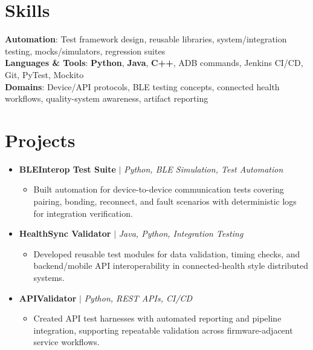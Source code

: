 \documentclass[letterpaper,10pt]{article}
\newcommand{\resumeItem}[1]{\item\small{{#1 \vspace{-2pt}}}}
\newcommand{\resumeProjectHeading}[1]{\item \small #1 \vspace{-2pt}}
\newcommand{\resumeSubHeadingListStart}{\begin{itemize}[leftmargin=0.0in, label={}]}
\newcommand{\resumeSubHeadingListEnd}{\end{itemize}}
\newcommand{\resumeProjItemListStart}{\begin{itemize}[leftmargin=0.15in,label=\textbullet,itemsep=0pt,topsep=0pt,parsep=0pt,partopsep=0pt]}
\newcommand{\resumeProjItemListEnd}{\end{itemize}\vspace{-4pt}}
\begin{document}
\section{Skills}
\begin{itemize}[leftmargin=0.15in, label={}]
\small{\item{
\textbf{Automation}: Test framework design, reusable libraries, system/integration testing, mocks/simulators, regression suites \\
\textbf{Languages \& Tools}: \textbf{Python}, \textbf{Java}, \textbf{C++}, ADB commands, Jenkins CI/CD, Git, PyTest, Mockito \\
\textbf{Domains}: Device/API protocols, BLE testing concepts, connected health workflows, quality-system awareness, artifact reporting
}}
\end{itemize}
\vspace{-16pt}
\section{Projects}
\resumeSubHeadingListStart
\vspace{-2pt}
\resumeProjectHeading{\textbf{BLEInterop Test Suite} $|$ \emph{Python, BLE Simulation, Test Automation}}
\resumeProjItemListStart
\resumeItem{Built automation for device-to-device communication tests covering pairing, bonding, reconnect, and fault scenarios with deterministic logs for integration verification.}
\resumeProjItemListEnd
\vspace{3pt}
\resumeProjectHeading{\textbf{HealthSync Validator} $|$ \emph{Java, Python, Integration Testing}}
\resumeProjItemListStart
\resumeItem{Developed reusable test modules for data validation, timing checks, and backend/mobile API interoperability in connected-health style distributed systems.}
\resumeProjItemListEnd
\vspace{3pt}
\resumeProjectHeading{\textbf{APIValidator} $|$ \emph{Python, REST APIs, CI/CD}}
\resumeProjItemListStart
\resumeItem{Created API test harnesses with automated reporting and pipeline integration, supporting repeatable validation across firmware-adjacent service workflows.}
\resumeProjItemListEnd
\resumeSubHeadingListEnd
\end{document}

